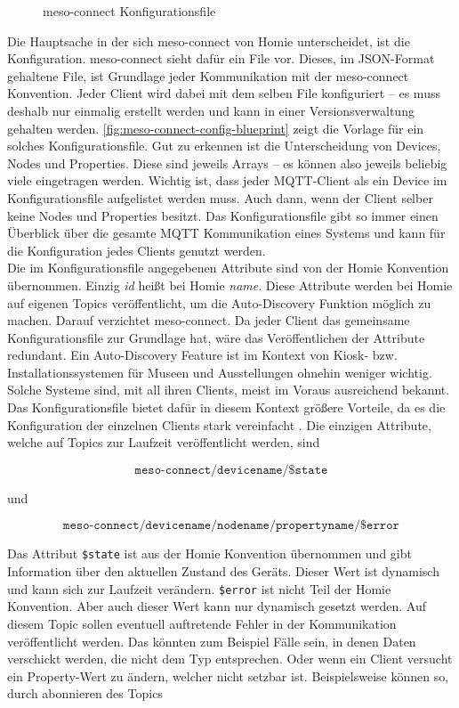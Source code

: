 \begin{figure}
  
  \caption{meso-connect Konfigurationsfile}
  \label{fig:meso-connect-config-blueprint}
\end{figure}

Die Hauptsache in der sich meso-connect von Homie unterscheidet, ist die Konfiguration. meso-connect
sieht dafür ein File vor. Dieses, im JSON-Format gehaltene File, ist Grundlage jeder Kommunikation
mit der meso-connect Konvention. Jeder Client wird dabei mit dem selben File konfiguriert -- es muss 
deshalb nur einmalig erstellt werden und kann in einer Versionsverwaltung gehalten werden. 
\autoref{fig:meso-connect-config-blueprint} zeigt die Vorlage für ein solches Konfigurationsfile. 
Gut zu erkennen ist die Unterscheidung von Devices, Nodes und Properties. Diese sind jeweils Arrays --
es können also jeweils beliebig viele eingetragen werden. Wichtig ist, dass jeder MQTT-Client als ein
Device im Konfigurationsfile aufgelistet werden muss. Auch dann, wenn der Client selber 
keine Nodes und Properties besitzt. Das Konfigurationsfile gibt so immer einen Überblick über die 
gesamte MQTT Kommunikation eines Systems und kann für die Konfiguration jedes Clients genutzt werden.\\
Die im Konfigurationsfile angegebenen Attribute sind von der Homie Konvention übernommen. Einzig \emph{id} heißt
bei Homie \emph{name}. Diese Attribute werden bei Homie auf eigenen Topics veröffentlicht, um die 
Auto-Discovery Funktion möglich zu machen. Darauf verzichtet meso-connect. Da jeder Client das gemeinsame
Konfigurationsfile zur Grundlage hat, wäre das Veröffentlichen der Attribute redundant. Ein Auto-Discovery
Feature ist im Kontext von Kiosk- bzw. Installationssystemen für Museen und Ausstellungen ohnehin weniger wichtig.
Solche Systeme sind, mit all ihren Clients, meist im Voraus ausreichend bekannt. Das Konfigurationsfile
bietet dafür in diesem Kontext größere Vorteile, da es die Konfiguration der einzelnen Clients stark
vereinfacht . Die einzigen Attribute, welche auf Topics zur Laufzeit veröffentlicht 
werden, sind

\[\texttt{meso-connect/devicename/\$state} \]

und

\[\texttt{meso-connect/devicename/nodename/propertyname/\$error} \]

Das Attribut \texttt{\$state} ist aus der Homie Konvention übernommen und gibt Information über den aktuellen
Zustand des Geräts. Dieser Wert ist dynamisch und kann sich zur Laufzeit verändern. \texttt{\$error} ist nicht 
Teil der Homie Konvention. Aber auch dieser Wert kann nur dynamisch gesetzt werden.
Auf diesem Topic sollen eventuell auftretende Fehler in der Kommunikation veröffentlicht
werden. Das könnten zum Beispiel Fälle sein, in denen Daten verschickt werden, die nicht dem Typ entsprechen.
Oder wenn ein Client versucht ein Property-Wert zu ändern, welcher nicht setzbar ist. Beispielsweise können so,
durch abonnieren des Topics

